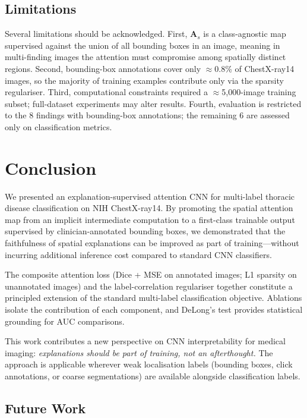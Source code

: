\documentclass[12pt, a4paper]{article}
\begin{document}
\subsection{Limitations}

Several limitations should be acknowledged. First, $\mathbf{A}_s$ is a class-agnostic
map supervised against the union of all bounding boxes in an image, meaning in
multi-finding images the attention must compromise among spatially distinct regions.
Second, bounding-box annotations cover only $\approx$0.8\% of ChestX-ray14 images, so
the majority of training examples contribute only via the sparsity regulariser. Third,
computational constraints required a $\approx$5,000-image training subset; full-dataset
experiments may alter results. Fourth, evaluation is restricted to the 8 findings with
bounding-box annotations; the remaining 6 are assessed only on classification metrics.

\section{Conclusion}

We presented an explanation-supervised attention CNN for multi-label thoracic disease
classification on NIH ChestX-ray14. By promoting the spatial attention map from an
implicit intermediate computation to a first-class trainable output supervised by
clinician-annotated bounding boxes, we demonstrated that the faithfulness of spatial
explanations can be improved as part of training---without incurring additional inference
cost compared to standard CNN classifiers.

The composite attention loss (Dice + MSE on annotated images; L1 sparsity on unannotated
images) and the label-correlation regulariser together constitute a principled extension
of the standard multi-label classification objective. Ablations isolate the contribution
of each component, and DeLong's test provides statistical grounding for AUC comparisons.

This work contributes a new perspective on CNN interpretability for medical imaging:
\emph{explanations should be part of training, not an afterthought.} The approach is
applicable wherever weak localisation labels (bounding boxes, click annotations, or coarse
segmentations) are available alongside classification labels.

\subsection{Future Work}
\end{document}
